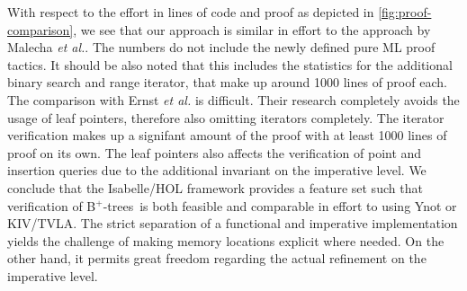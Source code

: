 \documentclass[a4paper,UKenglish,cleveref, autoref, thm-restate]{lipics-v2021}
\newcommand{\btrees}{B$^+$-trees}
\begin{document}
With respect to the effort in lines of code and proof
as depicted in \autoref{fig:proof-comparison}, we see
that our approach is similar in effort to the approach by Malecha \emph{et al.}.
The numbers do not include the newly defined pure ML proof tactics.
It should be also noted that this includes the statistics
for the additional binary search and range iterator,
that make up around 1000 lines of proof each.
The comparison with Ernst \emph{et al.} is difficult.
Their research completely avoids the usage of leaf pointers,
therefore also omitting iterators completely.
The iterator verification makes up a signifant amount of the proof
with at least 1000 lines of proof on its own.
The leaf pointers also affects the verification of point and insertion queries
due to the additional invariant on the imperative level.
We conclude that the Isabelle/HOL framework
provides a feature set
such that verification of \btrees\ is both feasible
and comparable in effort to using Ynot or KIV/TVLA.
The strict separation of a functional and imperative
implementation yields the challenge
of making memory locations explicit where needed.
On the other hand, it permits great freedom
regarding the actual refinement on the imperative level.
\end{document}
